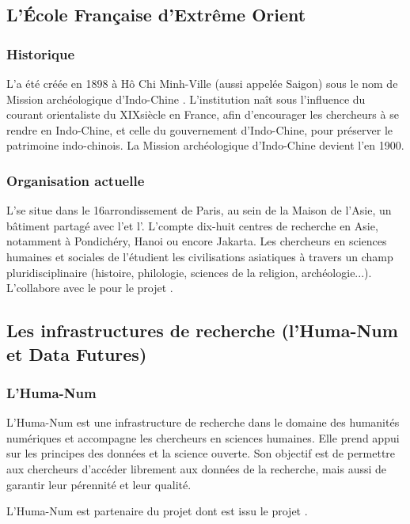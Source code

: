 \subsection{L’École Française d'Extrême Orient}

\subsubsection{Historique}
L'\EFEO a été créée en 1898 à Hô Chi Minh-Ville (aussi appelée Saigon) sous le nom de \og Mission archéologique d'Indo-Chine \fg. L'institution naît sous l'influence du courant orientaliste du XIX\ieme siècle en France, afin d'encourager les chercheurs à se rendre en Indo-Chine, et celle du gouvernement d'Indo-Chine, pour préserver le patrimoine indo-chinois. La \og Mission archéologique d'Indo-Chine \fg devient l'\EFEO en 1900.

\subsubsection{Organisation actuelle}
L'\EFEO se situe dans le 16\ieme arrondissement de Paris, au sein de la Maison de l'Asie, un bâtiment partagé avec l'\EPHE et l'\EHESS. L'\EFEO compte dix-huit centres de recherche en Asie, notamment à Pondichéry, Hanoi ou encore Jakarta. Les chercheurs en sciences humaines et sociales de l'\EFEO étudient les civilisations asiatiques à travers un champ pluridisciplinaire (histoire, philologie, sciences de la religion, archéologie...). L'\EFEO collabore avec le \cdf pour le projet \COREL. 

\subsection{Les infrastructures de recherche (l'\IR* Huma-Num et Data Futures)}
\subsubsection{L'\IR* Huma-Num}
L'\IR* Huma-Num est une infrastructure de recherche dans le domaine des humanités numériques et accompagne les chercheurs en sciences humaines. Elle prend appui sur les principes \fair des données et la science ouverte. Son objectif est de permettre aux chercheurs d'accéder librement aux données de la recherche, mais aussi de garantir leur pérennité et leur qualité. 

L'\IR* Huma-Num est partenaire du projet \LSC dont est issu le projet \COREL. 

